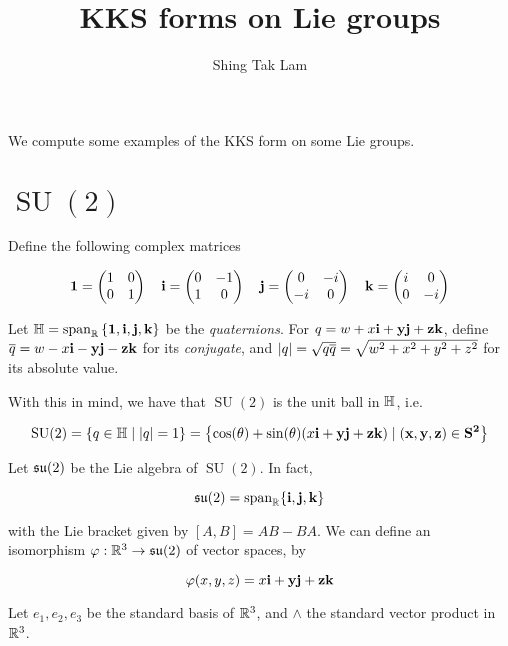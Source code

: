 \documentclass{article}
\title{KKS forms on Lie groups}
\author{Shing Tak Lam}
\newcommand{\su}{\mfs\mfu}
\DeclareMathOperator{\SU}{SU}
\begin{document}
\maketitle

We compute some examples of the KKS form on some Lie groups.

\section{\(\SU(2)\)}

Define the following complex matrices

\[\bf{1} = \begin{pmatrix}
1 & 0 \\
0 & 1
\end{pmatrix} \quad \bf{i} = \begin{pmatrix}
    0 & -1 \\
    1 & 0
\end{pmatrix} \quad \bf{j} = \begin{pmatrix}
    0 & -i \\
    -i & 0 
\end{pmatrix} \quad \bf{k} = \begin{pmatrix}
    i & 0 \\
    0 & -i
\end{pmatrix}\]

Let \(\mathbb{H} = \operatorname{span}_{\mathbb{R}}\left\{\bf 1, \bf i, \bf j, \bf k\right\}\) be the \emph{quaternions}. For \(q = w + x\bf i + y \bf j + z \bf k\), define \(\overline q = w - x\bf i - y \bf j - z \bf k\) for its \emph{conjugate}, and \(\abs{q} = \sqrt{q\overline q} = \sqrt{w^2 + x^2 + y^2 + z^2}\) for its absolute value.

With this in mind, we have that \(\SU(2)\) is the unit ball in \(\mathbb{H}\), i.e.

\[\SU(2) = \left\{q \in \bb H \mid \abs{q} = 1\right\} = \left\{\cos(\theta) + \sin(\theta)(x\bf i + y\bf j + z \bf k) \mid (x, y, z) \in S^2\right\}\]

Let \(\su(2)\) be the Lie algebra of \(\SU(2)\). In fact,

\[\su(2) = \Span_{\R}\{\bf i, \bf j, \bf k\}\]

with the Lie bracket given by \([A, B] = AB - BA\). We can define an isomorphism \(\varphi : \R^3 \to \su(2)\) of vector spaces, by

\[\varphi(x, y, z) = x\bf i + y\bf j + z\bf k\]

Let \(e_1, e_2, e_3\) be the standard basis of \(\mathbb{R}^3\), and \(\wedge\) the standard vector product in \(\mathbb{R}^3\).
\end{document}
